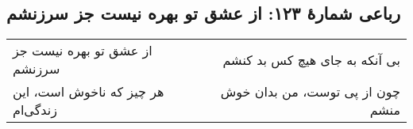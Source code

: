 \begin{center}
\section*{رباعی شمارهٔ ۱۲۳: از عشق تو بهره نیست جز سرزنشم}
\label{sec:123}
\begin{longtable}{l p{0.5cm} r}
از عشق تو بهره نیست جز سرزنشم
&&
بی آنکه به جای هیچ کس بد کنشم
\\
هر چیز که ناخوش است، این زندگی‌ام
&&
چون از پی توست، من بدان خوش منشم
\\
\end{longtable}
\end{center}
